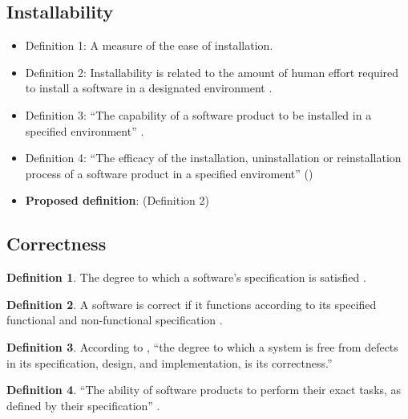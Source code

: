 \documentclass[letterpaper,cleveref]{lipics-v2019}
\theoremstyle{definition}
\newtheorem{defn}{Definition}
\begin{document}
\subsection{Installability}
\begin{itemize}
\item{Definition 1:} A measure of the ease of installation.\\
\item{Definition 2:} Installability is related to the amount of human effort required to install a software in a designated environment \cite{berander2005software}. \\
\item{Definition 3:} ``The capability of a software product to be installed in a specified environment'' \cite{berander2005software}.\\
\item{Definition 4:}  ``The efficacy of the installation, uninstallation or reinstallation process of a software product in a specified enviroment'' (\cite{iso201017043})\\
\item {\textbf{Proposed definition}:} (Definition 2)
\end{itemize}

\subsection{Correctness}

\begin{defn}
  The degree to which a software's specification is satisfied
  \citep{berander2005software}.
\end{defn}

\begin{defn} \label{CorrectDefnSelected}
  A software is correct if it functions according to its specified functional
  and non-functional specification \citep{GhezziEtAl2003}.
\end{defn}

\begin{defn}
  According to \citet{wilson2009quality}, ``the degree to which a system is free
  from defects in its specification, design, and implementation, is its
  correctness.''
\end{defn}

\begin{defn}
  ``The ability of software products to perform their exact tasks, as defined by
  their specification'' \citep{meyer1988object}.
\end{defn}
\end{document}

